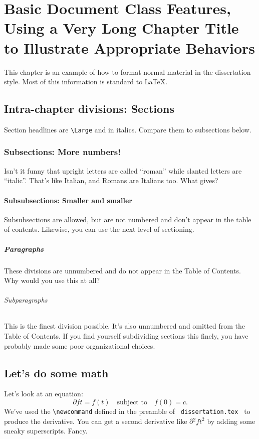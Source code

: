 \chapter{Basic Document Class Features, Using  a Very Long Chapter Title to Illustrate Appropriate Behaviors}
\label{chap:example}
\cite{ChangDemekhin02}
This chapter is an example of how to format normal material in the
dissertation style.  Most of this information is standard to \LaTeX.

\section{Intra-chapter divisions: Sections}
Section headlines are {\verb|\Large|} and in italics. Compare them
to subsections below. 

\subsection{Subsections: More numbers!}

Isn't it funny that upright letters are
called ``roman'' while slanted letters are ``italic''.  That's like Italian,
and Romans are Italians too.  What gives?  

\subsubsection{Subsubsections: Smaller and smaller}

Subsubsections are allowed, but are not numbered and don't appear in the
table of contents.  Likewise, you can use the next level of sectioning.
\paragraph{Paragraphs} These divisions are unnumbered and do not appear in the Table of Contents. Why would you use this at all?
\subparagraph{Subparagraphs} This is the finest division possible.  It's also
unnumbered and omitted from the Table of Contents. If you find yourself subdividing sections this finely, you have probably made some poor organizational choices. 

\section{Let's do some math}
Let's look at an equation:
\begin{equation}
\label{eq:diffeq}
\partial{f}{t} = f(t) \quad \text{subject to} \quad f(0) = c.
\end{equation}
We've used the {\verb|\newcommand|} defined in the preamble of 
{\verb| dissertation.tex |} to produce the derivative.  You can get a second
derivative like $\partial{^2 f}{t^2}$ by adding some sneaky superscripts.  Fancy.  

